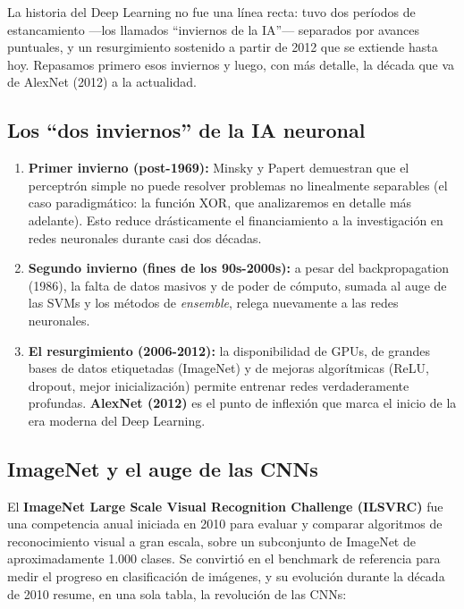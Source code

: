 \documentclass[
  letterpaper,
  DIV=11,
  numbers=noendperiod]{scrartcl}
\providecommand{\tightlist}{%
  \setlength{\itemsep}{0pt}\setlength{\parskip}{0pt}}
\begin{document}
La historia del Deep Learning no fue una línea recta: tuvo dos períodos
de estancamiento ---los llamados ``inviernos de la IA''--- separados por
avances puntuales, y un resurgimiento sostenido a partir de 2012 que se
extiende hasta hoy. Repasamos primero esos inviernos y luego, con más
detalle, la década que va de AlexNet (2012) a la actualidad.

\subsection{Los ``dos inviernos'' de la IA
neuronal}\label{los-dos-inviernos-de-la-ia-neuronal}

\begin{enumerate}
\def\labelenumi{\arabic{enumi}.}
\tightlist
\item
  \textbf{Primer invierno (post-1969):} Minsky y Papert demuestran que
  el perceptrón simple no puede resolver problemas no linealmente
  separables (el caso paradigmático: la función XOR, que analizaremos en
  detalle más adelante). Esto reduce drásticamente el financiamiento a
  la investigación en redes neuronales durante casi dos décadas.
\item
  \textbf{Segundo invierno (fines de los 90s-2000s):} a pesar del
  backpropagation (1986), la falta de datos masivos y de poder de
  cómputo, sumada al auge de las SVMs y los métodos de \emph{ensemble},
  relega nuevamente a las redes neuronales.
\item
  \textbf{El resurgimiento (2006-2012):} la disponibilidad de GPUs, de
  grandes bases de datos etiquetadas (ImageNet) y de mejoras
  algorítmicas (ReLU, dropout, mejor inicialización) permite entrenar
  redes verdaderamente profundas. \textbf{AlexNet (2012)} es el punto de
  inflexión que marca el inicio de la era moderna del Deep Learning.
\end{enumerate}

\subsection{ImageNet y el auge de las
CNNs}\label{imagenet-y-el-auge-de-las-cnns}

El \textbf{ImageNet Large Scale Visual Recognition Challenge (ILSVRC)}
fue una competencia anual iniciada en 2010 para evaluar y comparar
algoritmos de reconocimiento visual a gran escala, sobre un subconjunto
de ImageNet de aproximadamente 1.000 clases. Se convirtió en el
benchmark de referencia para medir el progreso en clasificación de
imágenes, y su evolución durante la década de 2010 resume, en una sola
tabla, la revolución de las CNNs:
\end{document}
